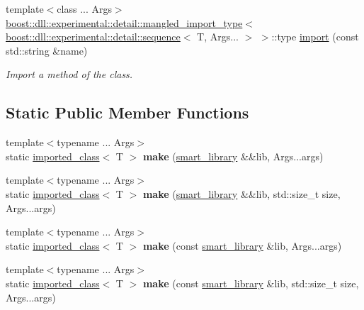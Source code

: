 \begin{DoxyCompactItemize}
\mbox{\label{a01664_a343a8146d111c9fa08a1942f0549af17}} 
{\footnotesize template$<$class ... Args$>$ }\\\hyperlink{a01688}{boost\+::dll\+::experimental\+::detail\+::mangled\+\_\+import\+\_\+type}$<$ \hyperlink{a01432}{boost\+::dll\+::experimental\+::detail\+::sequence}$<$ T, Args... $>$ $>$\+::type \hyperlink{a01664_a343a8146d111c9fa08a1942f0549af17}{import} (const std\+::string \&name)
\begin{DoxyCompactList}\small\item\em Import a method of the class. \end{DoxyCompactList}\end{DoxyCompactItemize}
\subsection*{Static Public Member Functions}
\begin{DoxyCompactItemize}
\item 
\mbox{\label{a01664_a126a35bd88a98508ce4fa80d95740b4b}} 
{\footnotesize template$<$typename ... Args$>$ }\\static \hyperlink{a01664}{imported\+\_\+class}$<$ T $>$ {\bfseries make} (\hyperlink{a01712}{smart\+\_\+library} \&\&lib, Args...\+args)
\item 
\mbox{\label{a01664_a3a674f8d3cfe52cc2c72711a9d25cf3f}} 
{\footnotesize template$<$typename ... Args$>$ }\\static \hyperlink{a01664}{imported\+\_\+class}$<$ T $>$ {\bfseries make} (\hyperlink{a01712}{smart\+\_\+library} \&\&lib, std\+::size\+\_\+t size, Args...\+args)
\item 
\mbox{\label{a01664_a2972dcd73fa59f34036a7be310164e64}} 
{\footnotesize template$<$typename ... Args$>$ }\\static \hyperlink{a01664}{imported\+\_\+class}$<$ T $>$ {\bfseries make} (const \hyperlink{a01712}{smart\+\_\+library} \&lib, Args...\+args)
\item 
\mbox{\label{a01664_ae344352c615aeb5c3bc38c2c37b3cbe8}} 
{\footnotesize template$<$typename ... Args$>$ }\\static \hyperlink{a01664}{imported\+\_\+class}$<$ T $>$ {\bfseries make} (const \hyperlink{a01712}{smart\+\_\+library} \&lib, std\+::size\+\_\+t size, Args...\+args)
\end{DoxyCompactItemize}


